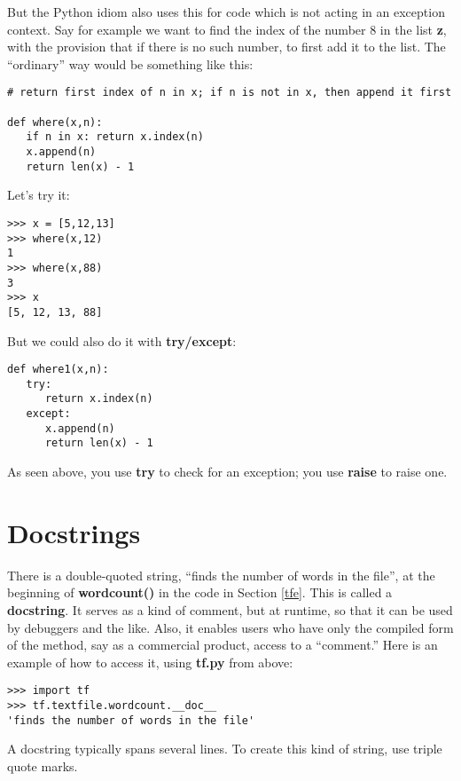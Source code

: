 But the Python idiom also uses this for code which is not acting in an
exception context.  Say for example we want to find the index of the
number 8 in the list {\bf z}, with the provision that if there is no
such number, to first add it to the list.  The ``ordinary'' way would be
something like this:

\begin{Verbatim}[fontsize=\relsize{-2}]
# return first index of n in x; if n is not in x, then append it first

def where(x,n):
   if n in x: return x.index(n)
   x.append(n)
   return len(x) - 1
\end{Verbatim}

Let's try it:

\begin{Verbatim}[fontsize=\relsize{-2}]
>>> x = [5,12,13]
>>> where(x,12)
1
>>> where(x,88)
3
>>> x
[5, 12, 13, 88]
\end{Verbatim}

But we could also do it with {\bf try/except}: 

\begin{Verbatim}[fontsize=\relsize{-2}]
def where1(x,n):
   try:
      return x.index(n)
   except:
      x.append(n)
      return len(x) - 1
\end{Verbatim}

As seen above, you use {\bf try} to check for an exception; you use {\bf
raise} to raise one.

\section{Docstrings} 
\label{docstrings}

There is a double-quoted string, ``finds the number of words in the
file'', at the beginning of {\bf wordcount()} in the code in Section
\ref{tfe}.  This is called a {\bf docstring}.  It serves as a kind of
comment, but at runtime, so that it can be used by debuggers and the
like.  Also, it enables users who have only the compiled form of the
method, say as a commercial product, access to a ``comment.''  Here is
an example of how to access it, using {\bf tf.py} from above:

\begin{Verbatim}[fontsize=\relsize{-2}]
>>> import tf
>>> tf.textfile.wordcount.__doc__
'finds the number of words in the file'
\end{Verbatim}  

A docstring typically spans several lines.  To create this kind of
string, use triple quote marks.

